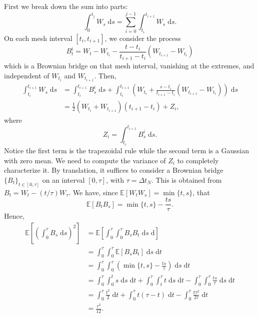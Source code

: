 \documentclass[reqno,12pt]{amsart}
\theoremstyle{plain}%
\theoremstyle{definition}
\begin{document}
First we break down the sum into parts:
\begin{equation}
    \int_0^{t_j} W_s\;\mathrm{d}s = \sum_{i = 0}^{j-1} \int_{t_i}^{t_{i+1}} W_s\;\mathrm{d}s.
\end{equation}
On each mesh interval $[t_i, t_{i+1}]$, we consider the process
\begin{equation}
    B_t^i = W_t - W_{t_i} - \frac{t - t_i}{t_{i+1}-t_i}(W_{t_{i+1}} - W_{t_i})
\end{equation}
which is a Brownian bridge on that mesh interval, vanishing at the extremes, and  independent of $W_{t_i}$ and $W_{t_{i+1}}$. Then,
\begin{align*}
    \int_{t_i}^{t_{i+1}} W_s\;\mathrm{d}s & = \int_{t_i}^{t_{i+1}} B_s^i\;\mathrm{d}s + \int_{t_i}^{t_{i+1}} \left( W_{t_i} + \frac{s - t_i}{t_{i+1}-t_i}(W_{t_{i+1}} - W_{t_i})\right)\;\mathrm{d}s \\
    & = \frac{1}{2}\left(W_{t_i} + W_{t_{i+1}}\right)(t_{i+1} - t_i) + Z_i,
\end{align*}
where
\begin{equation}
    Z_i = \int_{t_i}^{t_{i+1}} B_s^i\;\mathrm{d}s.
\end{equation}
Notice the first term is the trapezoidal rule while the second term is a Gaussian with zero mean. We need to compute the variance of $Z_i$ to completely characterize it. By translation, it suffices to consider a Brownian bridge $\{B_t\}_{t\in [0, \tau]}$ on an interval $[0, \tau]$, with $\tau = \Delta t_N$. This is obtained from $B_t = W_t - (t/\tau)W_\tau$. We have, since $\mathbb{E}[W_tW_s] = \min\{t, s\}$, that
\[
    \mathbb{E}[B_tB_s] = \min\{t, s\} - \frac{ts}{\tau}.
\]
Hence,
\begin{align*}
    \mathbb{E}\left[\left(\int_0^{\tau} B_s\;\mathrm{d}s\right)^2\right] & = \mathbb{E}\left[\int_0^{\tau} \int_0^\tau B_sB_t\;\mathrm{d}s\;\mathrm{d}\right] \\
    & = \int_0^\tau \int_0^\tau \mathbb{E}[B_sB_t] \;\mathrm{d}s\;\mathrm{d}t \\
    & = \int_0^\tau \int_0^\tau \left(\min\{t, s\} - \frac{ts}{\tau}\right) \;\mathrm{d}s\;\mathrm{d}t \\
    & = \int_0^\tau \int_0^t s\;\mathrm{d}s\;\mathrm{d}t + \int_0^\tau \int_t^\tau t\;\mathrm{d}s\;\mathrm{d}t - \int_0^\tau \int_0^\tau \frac{ts}{\tau} \;\mathrm{d}s\;\mathrm{d}t \\
    & = \int_0^\tau \frac{t^2}{2}\;\mathrm{d}t + \int_0^\tau t(\tau - t)\;\mathrm{d}t - \int_0^\tau \frac{t\tau^2}{2\tau}\;\mathrm{d}t \\
    & = \frac{\tau^3}{12}.
\end{align*}
\end{document}
